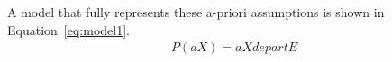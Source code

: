A model that fully represents these a-priori assumptions is shown in Equation~\ref{eq:model1}.
\begin{align}
    P(aX) = aXdepartE
\end{align}
